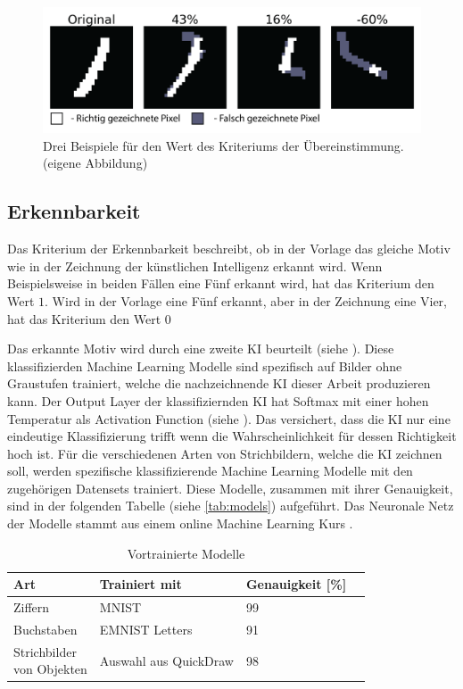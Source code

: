 \begin{figure}[!ht]
 \centering
 \includegraphics[width=\textwidth]{images/methode/ubereinstimm.png}
 \caption{Drei Beispiele für den Wert des Kriteriums der Übereinstimmung. (eigene Abbildung)}\label{fig:ubereinstimmung}
\end{figure}

\subsection{Erkennbarkeit}\label{sub:m_eval_rec}
Das Kriterium der Erkennbarkeit beschreibt, ob in der Vorlage das gleiche Motiv
wie in der Zeichnung der künstlichen Intelligenz erkannt wird. Wenn
Beispielsweise in beiden Fällen eine Fünf erkannt wird, hat das Kriterium den
Wert $1$. Wird in der Vorlage eine Fünf erkannt, aber in der Zeichnung eine
Vier, hat das Kriterium den Wert $0$
 
Das erkannte Motiv wird durch eine zweite KI beurteilt (siehe
). Diese klassifizierden Machine Learning Modelle sind
spezifisch auf Bilder ohne Graustufen trainiert, welche die nachzeichnende KI
dieser Arbeit produzieren kann. Der Output Layer der klassifiziernden KI hat
Softmax mit einer hohen Temperatur als Activation Function (siehe
). Das versichert, dass die KI nur eine eindeutige
Klassifizierung trifft wenn die Wahrscheinlichkeit für dessen Richtigkeit hoch
ist. Für die verschiedenen Arten von Strichbildern, welche die KI zeichnen soll,
werden spezifische klassifizierende Machine Learning Modelle mit den zugehörigen
Datensets trainiert. Diese Modelle, zusammen mit ihrer Genauigkeit, sind in der
folgenden Tabelle (siehe \autoref{tab:models}) aufgeführt. Das Neuronale Netz
der Modelle stammt aus einem online Machine Learning Kurs \cite{wang_deep_2021}. %

\begin{table}[!ht]
 \centering  
 \begin{tabular}{|l|l|l|l|}
 \hline
     Art & Trainiert mit & Genauigkeit [\%]\\ \hline
     Ziffern & MNIST & 99\\ \hline
     Buchstaben  & EMNIST Letters & 91\\ \hline
     \makecell{Strichbilder\\von Objekten}  & Auswahl aus QuickDraw & 98\\ \hline
 \end{tabular}
 \caption{Vortrainierte Modelle}\label{tab:models}
\end{table}
 
